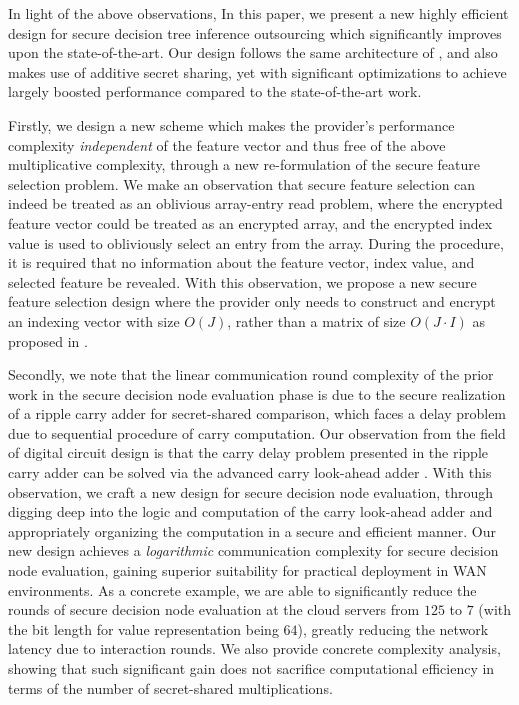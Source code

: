 \documentclass[10pt,journal,compsoc]{IEEEtran}
\begin{document}
In light of the above observations, In this paper, we present a new highly efficient design for secure decision tree inference outsourcing which significantly improves upon the state-of-the-art.
%
Our design follows the same architecture of \cite{ZhengDWWN20}, and also makes use of additive secret sharing, yet with significant optimizations to achieve largely boosted performance compared to the state-of-the-art work.
%


Firstly, we design a new scheme which makes the provider's performance complexity \emph{independent} of the feature vector and thus free of the above multiplicative complexity, through a new re-formulation of the secure feature selection problem.
%
We make an observation that secure feature selection can indeed be treated as an oblivious array-entry read problem, where the encrypted feature vector could be treated as an encrypted array, and the encrypted index value is used to obliviously select an entry from the array. 
%
During the procedure, it is required that no information about the feature vector, index value, and selected feature be revealed. 
%
With this observation, we propose a new secure feature selection design where the provider only needs to construct and encrypt an indexing vector with size $O(J)$, rather than a matrix of size $O(J\cdot I)$ as proposed in \cite{ZhengDWWN20}.



Secondly, we note that the linear communication round complexity of the prior work \cite{ZhengDWWN20} in the secure decision node evaluation phase is due to the secure realization of a ripple carry adder for secret-shared comparison, which faces a delay problem due to sequential procedure of carry computation.
% 
Our observation from the field of digital circuit design is that the carry delay problem presented in the ripple carry adder can be solved via the advanced carry look-ahead adder \cite{DHarris03}.
%
With this observation, we craft a new design for secure decision node evaluation, through digging deep into the logic and computation of the carry look-ahead adder and appropriately organizing the computation in a secure and efficient manner. 
%
Our new design achieves a \emph{logarithmic} communication complexity for secure decision node evaluation, gaining superior suitability for practical deployment in WAN environments.
%
%
As a concrete example, we are able to significantly reduce the rounds of secure decision node evaluation at the cloud servers from $125$ to $7$ (with the bit length for value representation being $64$), greatly reducing the network latency due to interaction rounds.
%
We also provide concrete complexity analysis, showing that such significant gain does not sacrifice computational efficiency in terms of the number of secret-shared multiplications.
%
\end{document}
